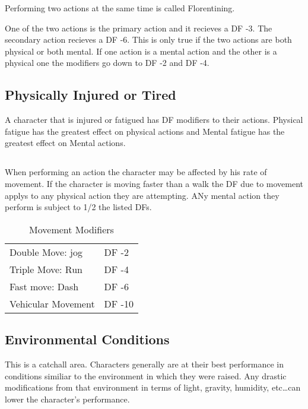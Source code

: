 Performing two actions at the same time is called Florentining.

One of the two actions is the primary action and it recieves a 
DF -3. The secondary action recieves a DF -6. This is only true 
if the two actions are both physical or both mental. If one 
action is a mental action and the other is a physical one the modifiers
go down to DF -2 and DF -4.



\subsection{Physically Injured or Tired}

A character that is injured or fatigued has DF modifiers to 
their actions. Physical fatigue has the greatest effect on physical actions 
and Mental fatigue has the greatest effect on Mental actions.




\subsection{}

When performing an action the character may be affected by 
his rate of movement. If the character is moving faster than a 
walk the DF due to movement applys to any physical action they are 
attempting. ANy mental action they perform is subject to 1/2 
the listed DFs.


\begin{table}[h]
	\begin{tabular}{ll}
	Double Move: jog							  & DF -2 \\
	Triple Move: Run							  & DF -4 \\
	Fast move: Dash							 & DF -6\\
	Vehicular Movement							& DF -10 \\ 
    \end{tabular}
    \caption{Movement Modifiers}
\end{table}

\subsection{Environmental Conditions}

This is a catchall area. Characters generally are at their best 
performance in conditions similiar to the environment in which they 
were raised. Any drastic modifications from that environment in 
terms of light, gravity, humidity, etc\dots can lower the character's 
performance.

